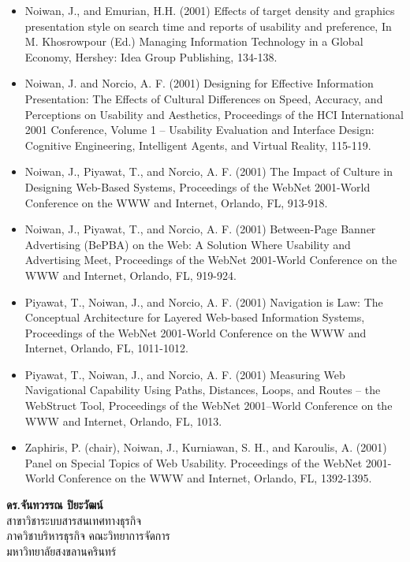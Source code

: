 \begin{tcolorbox}[breakable,enhanced,fonttitle=\bfseries]
\begin{itemize}
	\item Noiwan, J., and Emurian, H.H. (2001) Effects of target density and graphics presentation style on search time and reports of usability and preference, In M. Khosrowpour (Ed.) Managing Information Technology in a Global Economy, Hershey: Idea Group Publishing, 134-138.
	\item Noiwan, J. and Norcio, A. F. (2001) Designing for Effective Information Presentation: The Effects of Cultural Differences on Speed, Accuracy, and Perceptions on Usability and Aesthetics, Proceedings of the HCI International 2001 Conference, Volume 1 – Usability Evaluation and Interface Design: Cognitive Engineering, Intelligent Agents, and Virtual Reality, 115-119.
	\item Noiwan, J., Piyawat, T., and Norcio, A. F. (2001) The Impact of Culture in Designing Web-Based Systems, Proceedings of the WebNet 2001-World Conference on the WWW and Internet, Orlando, FL, 913-918.
	\item Noiwan, J., Piyawat, T., and Norcio, A. F. (2001) Between-Page Banner Advertising (BePBA) on the Web: A Solution Where Usability and Advertising Meet, Proceedings of the WebNet 2001-World Conference on the WWW and Internet, Orlando, FL, 919-924.
	\item Piyawat, T., Noiwan, J., and Norcio, A. F. (2001) Navigation is Law: The Conceptual Architecture for Layered Web-based Information Systems, Proceedings of the WebNet 2001-World Conference on the WWW and Internet, Orlando, FL, 1011-1012.
	\item Piyawat, T., Noiwan, J., and Norcio, A. F. (2001) Measuring Web Navigational Capability Using Paths, Distances, Loops, and Routes – the WebStruct Tool, Proceedings of the WebNet 2001–World Conference on the WWW and Internet, Orlando, FL, 1013.
	\item Zaphiris, P. (chair), Noiwan, J., Kurniawan, S. H., and Karoulis, A. (2001) Panel on Special Topics of Web Usability. Proceedings of the WebNet 2001-World Conference on the WWW and Internet, Orlando, FL, 1392-1395.
\end{itemize}
\end{tcolorbox}
\vspace{1.5cm}


\vspace{10mm}
\noindent
\textbf{ดร.จันทวรรณ ปิยะวัฒน์}\\
สาขาวิชาระบบสารสนเทศทางธุรกิจ\\
ภาควิชาบริหารธุรกิจ คณะวิทยาการจัดการ\\
มหาวิทยาลัยสงขลานครินทร์